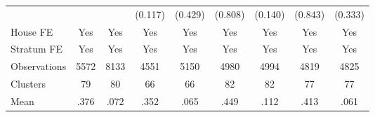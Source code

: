 {\begin{tabular}{l*{8}{c}}
                &                  &                  &  (0.117)         &  (0.429)         &  (0.808)         &  (0.140)         &  (0.843)         &  (0.333)         \\
House FE        &      Yes         &      Yes         &      Yes         &      Yes         &      Yes         &      Yes         &      Yes         &      Yes         \\
Stratum FE      &      Yes         &      Yes         &      Yes         &      Yes         &      Yes         &      Yes         &      Yes         &      Yes         \\
\midrule
Observations    &     5572         &     8133         &     4551         &     5150         &     4980         &     4994         &     4819         &     4825         \\
Clusters        &       79         &       80         &       66         &       66         &       82         &       82         &       77         &       77         \\
Mean            &     .376         &     .072         &     .352         &     .065         &     .449         &     .112         &     .413         &     .061         \\
\bottomrule
\end{tabular}
}
